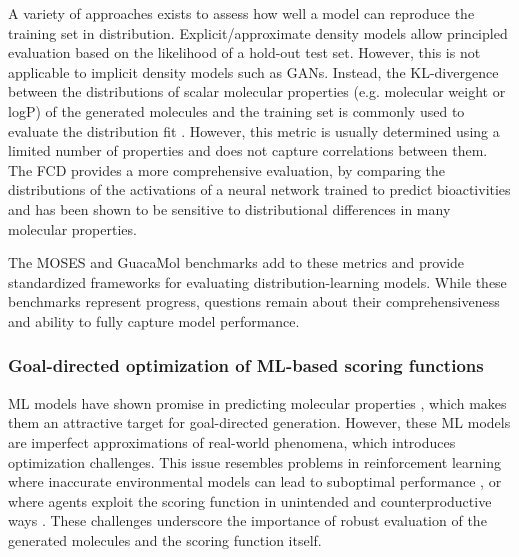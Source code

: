 A variety of approaches exists to assess how well a model can reproduce the training set in
distribution. Explicit/approximate density models allow principled evaluation based on the
likelihood of a hold-out test set. However, this is not applicable to implicit density models such
as \acp{GAN}. Instead, the KL-divergence between the distributions of scalar molecular properties
(e.g. molecular weight or logP) of the generated molecules and the training set is commonly used to
evaluate the distribution fit
\citep{brownGuacaMolBenchmarkingModels2019,polykovskiyMolecularSetsMOSES2020}. However, this metric
is usually determined using a limited number of properties and does not capture correlations between
them. The \ac{FCD} \citep{preuerFrechetChemNetDistance2018} provides a more comprehensive
evaluation, by comparing the distributions of the activations of a neural network trained to predict
bioactivities and has been shown to be sensitive to distributional differences in many molecular
properties.

The MOSES \citep{polykovskiyMolecularSetsMOSES2020} and GuacaMol
\citep{brownGuacaMolBenchmarkingModels2019} benchmarks add to these metrics and provide standardized
frameworks for evaluating distribution-learning models. While these benchmarks represent progress,
questions remain about their comprehensiveness and ability to fully capture model performance.

\subsubsection{Goal-directed optimization of ML-based scoring functions}
\ac{ML} models have shown promise in predicting molecular properties
\citep{unterthinerDeepLearningOpportunity2015,mayrDeepToxToxicityPrediction2016,klambauerMachineLearningDrug2019,vamathevanApplicationsMachineLearning2019,chenRiseDeepLearning2018,stokesDeepLearningApproach2020},
which makes them an attractive target for goal-directed generation. However, these \ac{ML} models are imperfect
approximations of real-world phenomena, which introduces optimization challenges. This issue resembles problems in
reinforcement learning \citep{suttonIntroductionReinforcementLearning1998} where inaccurate environmental models can
lead to suboptimal performance \citep{abbeelUsingInaccurateModels2006}, or where agents exploit the scoring function in
unintended and counterproductive ways \citep{lehmanSurprisingCreativityDigital2019}. These challenges underscore the
importance of robust evaluation of the generated molecules and the scoring function itself.

